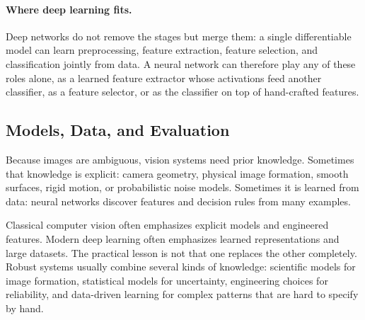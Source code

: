 \paragraph{Where deep learning fits.}
Deep networks do not remove the stages but merge them: a single differentiable
model can learn preprocessing, feature extraction, feature selection, and
classification jointly from data. A neural network can therefore play any of
these roles alone, as a learned feature extractor whose activations feed another
classifier, as a feature selector, or as the classifier on top of hand-crafted
features.

\subsection{Models, Data, and Evaluation}

Because images are ambiguous, vision systems need prior knowledge. Sometimes
that knowledge is explicit: camera geometry, physical image formation, smooth
surfaces, rigid motion, or probabilistic noise models. Sometimes it is learned
from data: neural networks discover features and decision rules from many
examples.

Classical computer vision often emphasizes explicit models and engineered
features. Modern deep learning often emphasizes learned representations and
large datasets. The practical lesson is not that one replaces the other
completely. Robust systems usually combine several kinds of knowledge:
scientific models for image formation, statistical models for uncertainty,
engineering choices for reliability, and data-driven learning for complex
patterns that are hard to specify by hand.

